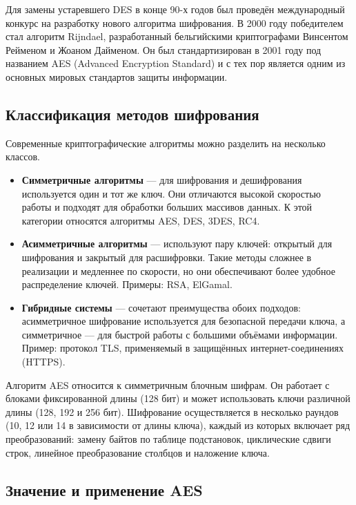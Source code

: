 Для замены устаревшего DES в конце 90-х годов был проведён международный конкурс на разработку нового алгоритма шифрования. В 2000 году победителем стал алгоритм Rijndael, разработанный бельгийскими криптографами Винсентом Рейменом и Жоаном Дайменом. Он был стандартизирован в 2001 году под названием AES (Advanced Encryption Standard) и с тех пор является одним из основных мировых стандартов защиты информации.  

\subsection{Классификация методов шифрования}

Современные криптографические алгоритмы можно разделить на несколько классов.  

\begin{itemize}
	\item \textbf{Симметричные алгоритмы} — для шифрования и дешифрования используется один и тот же ключ. Они отличаются высокой скоростью работы и подходят для обработки больших массивов данных. К этой категории относятся алгоритмы AES, DES, 3DES, RC4.  
	\item \textbf{Асимметричные алгоритмы} — используют пару ключей: открытый для шифрования и закрытый для расшифровки. Такие методы сложнее в реализации и медленнее по скорости, но они обеспечивают более удобное распределение ключей. Примеры: RSA, ElGamal.  
	\item \textbf{Гибридные системы} — сочетают преимущества обоих подходов: асимметричное шифрование используется для безопасной передачи ключа, а симметричное — для быстрой работы с большими объёмами информации. Пример: протокол TLS, применяемый в защищённых интернет-соединениях (HTTPS).  
\end{itemize}

Алгоритм AES относится к симметричным блочным шифрам. Он работает с блоками фиксированной длины (128 бит) и может использовать ключи различной длины (128, 192 и 256 бит). Шифрование осуществляется в несколько раундов (10, 12 или 14 в зависимости от длины ключа), каждый из которых включает ряд преобразований: замену байтов по таблице подстановок, циклические сдвиги строк, линейное преобразование столбцов и наложение ключа.  

\subsection{Значение и применение AES}

